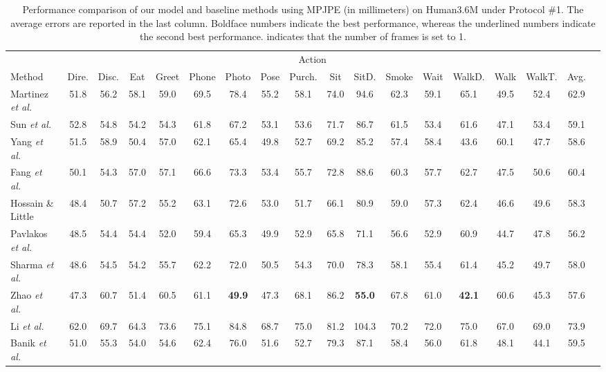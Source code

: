 \documentclass[10pt,journal]{IEEEtran}
\begin{document}
\begin{table*}[!htb]
\caption{Performance comparison of our model and baseline methods using MPJPE (in millimeters) on Human3.6M under Protocol \#1. The average errors are reported in the last column. Boldface numbers indicate the best performance, whereas the underlined numbers indicate the second best performance.  indicates that the number of frames is set to 1.}
\small
\setlength{\tabcolsep}{1pt}
\smallskip
\centering
\begin{tabular}{l*{17}{c}}
\toprule[1pt]
& \multicolumn{15}{c}{Action}\\
\cmidrule(lr){2-16}
Method & Dire. & Disc. &  Eat & Greet & Phone & Photo &  Pose & Purch. & Sit & SitD. & Smoke & Wait & WalkD. & Walk & WalkT. & Avg.\\
\midrule[.8pt]
Martinez \textit{et al.}~\cite{martinez2017simple} &  51.8 &56.2 &58.1 &59.0 &69.5& 78.4 &55.2 &58.1 &74.0 &94.6 &62.3 &59.1& 65.1& 49.5& 52.4 &62.9\\
Sun \textit{et al.}~\cite{sun2017compositional} &52.8& 54.8& 54.2& 54.3 &61.8 &67.2& 53.1& 53.6 &71.7 &86.7 &61.5 &53.4& 61.6 &47.1& 53.4 &59.1\\
Yang \textit{et al.}~\cite{yang20183d} & 51.5& 58.9&  50.4 &57.0& 62.1& 65.4 &49.8& 52.7& 69.2& 85.2& 57.4& 58.4& 43.6& 60.1& 47.7& 58.6\\
Fang \textit{et al.}~\cite{fang2018learning}& 50.1 &54.3& 57.0& 57.1& 66.6& 73.3& 53.4& 55.7& 72.8& 88.6& 60.3 &57.7& 62.7& 47.5 &50.6& 60.4\\
Hossain \& Little~\cite{rayat2018exploiting}  & 48.4 & 50.7 & 57.2 & 55.2 & 63.1 & 72.6 & 53.0 & 51.7 & 66.1 & 80.9 & 59.0 & 57.3 & 62.4 & 46.6 & 49.6 & 58.3\\
Pavlakos \textit{et al.}~\cite{pavlakos2018ordinal} & 48.5& 54.4& 54.4& 52.0 &59.4 &65.3 &49.9& 52.9& 65.8 &71.1& 56.6& 52.9& 60.9& 44.7& 47.8& 56.2\\
Sharma \textit{et al.}~\cite{sharma2019monocular} & 48.6 &54.5& 54.2& 55.7& 62.2& 72.0& 50.5& 54.3& 70.0& 78.3 &58.1& 55.4& 61.4& 45.2& 49.7& 58.0\\
Zhao \textit{et al.}~\cite{zhao2019semantic} & 47.3& 60.7& 51.4 &60.5& 61.1& \textbf{49.9}& 47.3& 68.1 &86.2& \textbf{55.0}& 67.8& 61.0& \textbf{42.1}& 60.6& 45.3& 57.6\\
Li \textit{et al.}~\cite{ChenLiLee:2020} & 62.0 & 69.7 & 64.3 & 73.6 & 75.1 & 84.8 & 68.7 & 75.0 & 81.2 & 104.3 & 70.2 & 72.0 & 75.0 & 67.0 & 69.0 & 73.9\\
Banik \textit{et al.}~\cite{Banik:2021} & 51.0 & 55.3 & 54.0 & 54.6 & 62.4 & 76.0 & 51.6 & 52.7 & 79.3 & 87.1 & 58.4 & 56.0 & 61.8 & 48.1 & 44.1 & 59.5\\

\end{tabular}
\end{table*}
\end{document}
